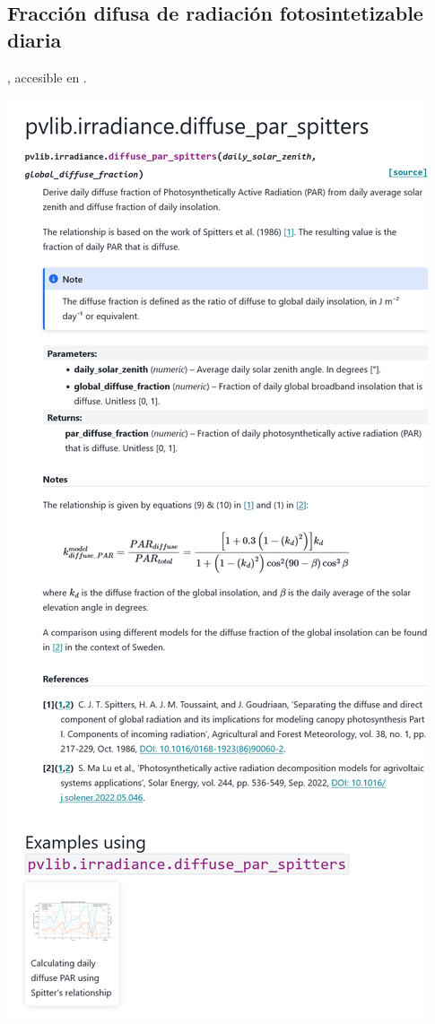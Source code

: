\begin{myparindent}{0pt}
\newpage\section{Fracción difusa de radiación fotosintetizable diaria} \label{sct:doc_par_difusa}

, accesible en .

\includegraphics[width=\linewidth,height=0.9\textheight,keepaspectratio]{images/docs_funcs/pvlib.irradiance.diffuse_par_spitters.png}


\end{myparindent}
